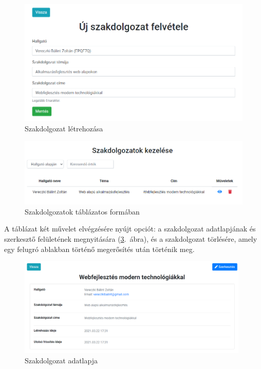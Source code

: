 \documentclass[
]{thesis-ekf}
\theoremstyle{definition}
\theoremstyle{remark}
\begin{document}
	\begin{figure}[!h]
		\centering
		\includegraphics[width=12cm]{kepek/screenshots/oktato_szakdolgozat_letrehozas.png}
		\caption{Szakdolgozat létrehozása}
		\label{fig:oktato_szakdolgozat_letrehozas}
	\end{figure}
	
	\begin{figure}[!h]
		\centering
		\includegraphics[width=12cm]{kepek/screenshots/oktato_szakdolgozat_tablazat.png}
		\caption{Szakdolgozatok táblázatos formában}
		\label{fig:oktato_szakdolgozat_tablazat}
	\end{figure}
	
	A táblázat két művelet elvégzésére nyújt opciót: a szakdolgozat adatlapjának és szerkesztő felületének megnyitására (\ref{fig:oktato_szakdolgozat_adatlap}.~ábra), és a szakdolgozat törlésére, amely egy felugró ablakban történő megerősítés után történik meg.
	
	\begin{figure}[!h]
		\centering
		\includegraphics[width=11cm]{kepek/screenshots/oktato_szakdolgozat_adatlap.png}
		\caption{Szakdolgozat adatlapja}
		\label{fig:oktato_szakdolgozat_adatlap}
	\end{figure}
	
\end{document}
